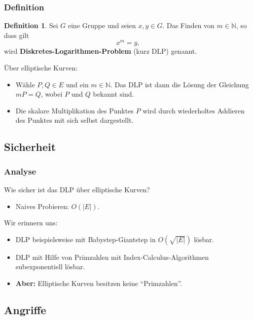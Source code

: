\documentclass{beamer}
\theoremstyle{plain}
\theoremstyle{definition}
\newtheorem{defn}[thm]{Definition}
\theoremstyle{rem}
\begin{document}
\begin{frame}
    \frametitle{Definition}
    \begin{defn} \label{DLP}
        Sei $G$ eine Gruppe und seien $x,y \in G$. Das Finden von $m \in \mathbb{N}$, so dass gilt
        \begin{equation*}
            x^m = y,
        \end{equation*}
        wird \textbf{Diskretes-Logarithmen-Problem} (kurz DLP) genannt.
    \end{defn}
    \pause
    Über elliptische Kurven:
    \begin{itemize}[<+->]
        \item Wähle $P,Q \in E$ und ein $m \in \mathbb{N}$. Das DLP ist dann die Lösung der Gleichung $mP = Q$, wobei $P$ und $Q$ bekannt sind.
        \item Die skalare Multiplikation des Punktes $P$ wird durch wiederholtes Addieren des Punktes mit sich selbst dargestellt.
    \end{itemize}

\end{frame}

\subsection{Sicherheit}

\begin{frame}
    \frametitle{Analyse}
    Wie sicher ist das DLP über elliptische Kurven?
    \pause
    \begin{itemize}
        \item Naives Probieren: $O(|E|)$.
    \end{itemize}
    \pause
    Wir erinnern uns:
    \begin{itemize}[<+->]
        \item DLP beispielsweise mit Babystep-Giantstep in $O(\sqrt{|E|})$ lösbar.
        \item DLP mit Hilfe von Primzahlen mit Index-Calculus-Algorithmen subexponentiell lösbar.
        \item[] \textbf{Aber:} Elliptische Kurven besitzen keine ``Primzahlen''.
    \end{itemize}
\end{frame}

\subsection{Angriffe}
\end{document}

